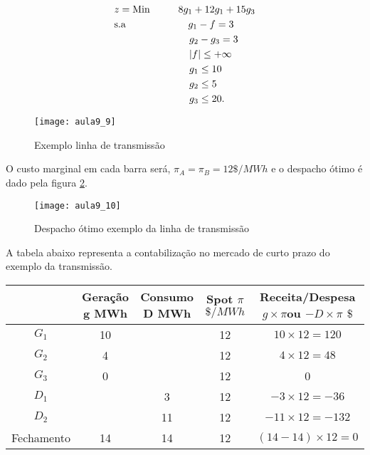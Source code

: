 \begin{align}
    & z={\text{Min}} \hspace{1cm} 8g_{1}+12g_{1}+15g_{3} \\
    & \text{s.a}  \hspace{2.2cm}   g_{1}-f=3 \\
    &             \hspace{2.65cm} g_{2}-g_{3}=3 \\
    &             \hspace{2.65cm} |f|\leq + \infty \\
    &             \hspace{2.65cm} g_{1}\leq 10 \\
    &             \hspace{2.65cm} g_{2}\leq 5 \\
    &             \hspace{2.65cm} g_{3}\leq 20. \\
    \end{align}
\begin{figure}[H]
\begin{centering}
\texttt{[image: aula9\_9]}\protect\caption{\label{fig:aula9-9} Exemplo linha de transmissão}
\end{centering}
\end{figure}
O custo marginal em cada barra será, $\pi_{A}=\pi_{B}=12\$/MWh$ e o despacho ótimo é dado pela figura  \ref{fig:aula9-10}.
\begin{figure}[H]
\begin{centering}
\texttt{[image: aula9\_10]}\protect\caption{\label{fig:aula9-10} Despacho ótimo exemplo da linha de transmissão }
\end{centering}
\end{figure}
A tabela abaixo representa a contabilização no mercado de curto prazo do exemplo da transmissão.

\begin{tabular}{|c|c|c|c|c|}
\hline 
 & Geração g MWh & Consumo D MWh & Spot $\pi$$\$/MWh$ & Receita/Despesa $g\times\pi$ou $-D\times\pi$ $\$$\tabularnewline
\hline 
\hline 
$G_{1}$ & 10 &  & 12 & $10\times12=120$\tabularnewline
\hline 
$G_{2}$ & 4 &  & 12 & $4\times12=48$\tabularnewline
\hline 
$G_{3}$ & 0 &  & 12 & 0\tabularnewline
\hline 
$D_{1}$ &  & 3 & 12 & $-3\times12=-36$\tabularnewline
\hline 
$D_{2}$ &  & 11 & 12 & $-11\times12=-132$\tabularnewline
\hline 
Fechamento & 14 & 14 & 12 & $(14-14)\times12=0$\tabularnewline
\hline 

\end{tabular}



